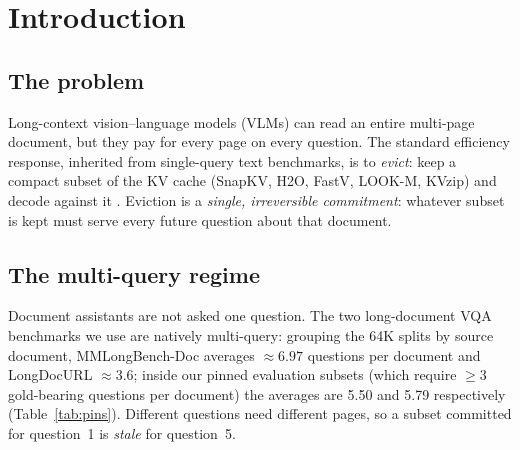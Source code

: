 \documentclass[11pt,letterpaper]{article}
\begin{document}
\begin{abstract}
\textbf{Status.} Every number here is a development-pin result (the 80-document/cell
confirmatory pin, now development-only). The sealed fresh test set (73/45 documents) is
\textbf{untouched}, reserved for a single one-touch final evaluation that has not run; the
scope decision on the LongDocURL cell is held for a human fork (\S\ref{sec:roadmap-lanes}).
\end{abstract}

\tableofcontents
\newpage

\section{Introduction}\label{sec:intro}

\subsection{The problem}
Long-context vision--language models (VLMs) can read an entire multi-page document, but they pay
for every page on every question. The standard efficiency response, inherited from single-query
text benchmarks, is to \emph{evict}: keep a compact subset of the KV cache (SnapKV, H2O, FastV,
LOOK-M, KVzip) and decode against it \citep{li2024snapkv,zhang2023h2o,chen2024fastv,wan2024lookm,kim2025kvzip}.
Eviction is a \emph{single, irreversible commitment}: whatever subset is kept must serve every
future question about that document.

\subsection{The multi-query regime}
Document assistants are not asked one question. The two long-document VQA benchmarks we use are
natively multi-query: grouping the 64K splits by source document, MMLongBench-Doc
\citep{ma2024mmlongbench} averages $\approx 6.97$ questions per document and LongDocURL
\citep{deng2025longdocurl} $\approx 3.6$; inside our pinned evaluation subsets (which require
$\geq 3$ gold-bearing questions per document) the averages are 5.50 and 5.79 respectively
(Table~\ref{tab:pins}). Different questions need different pages, so a subset committed for
question~1 is \emph{stale} for question~5.
\end{document}
